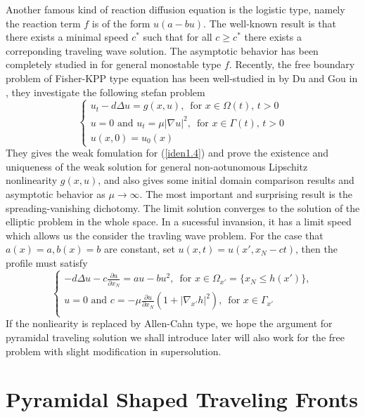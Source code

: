 \documentclass[12pt, a4paper]{article}
\numberwithin{equation}{section}
\newcommand{\pd}[2]{\frac{\partial #1}{\partial #2}}
\begin{document}
\begin{CJK}{UTF8}{bkai}
	Another famous kind of reaction diffusion equation is the logistic type, namely the reaction term $f$ is of the form $u(a-bu)$. The well-known result is that there exists a minimal speed $c^*$ such that for all $c\geq c^*$ there exists a correponding traveling wave solution. The asymptotic behavior has been completely studied in \cite{Sa1976} for general monostable type $f$. Recently, the free boundary problem of Fisher-KPP type equation has been well-studied in by Du and Gou in \cite{DG2012}, they investigate the following stefan problem
\begin{equation}\label{iden1.4}
\begin{cases}
	u_t-d\Delta u=g(x,u),\,\mbox{ for }x\in\Omega(t),\,t>0\\
	u=0\mbox{ and }u_t=\mu|\nabla u|^2,\,\mbox{ for }x\in\Gamma(t),\,t>0\\
	u(x,0)=u_0(x)
\end{cases}
\end{equation}
They gives the weak fomulation for (\ref{iden1.4}) and prove the existence and uniqueness of the weak solution for general non-aotunomous Lipschitz nonlinearity $g(x,u)$, and also gives some initial domain comparison results and asymptotic behavior as $\mu\to\infty$. The most important and surprising result is the spreading-vanishing dichotomy. The limit solution converges to the solution of the elliptic problem in the whole space. In a sucessful invansion, it has a limit speed which allows us the consider the travling wave problem. For the case that $a(x)=a, b(x)=b$ are constant, set $u(x,t)=u(x',x_N-ct)$, then the profile must satisfy
\begin{equation}
\begin{cases}
	-d\Delta u-c\pd{u}{x_N}=au-bu^2,\,\mbox{ for }x\in\Omega_{x'}=\{x_N\leq h(x')\},\\
	u=0\mbox{ and }c=-\mu\pd{u}{x_N}(1+|\nabla_{x'}h|^2),\,\mbox{ for }x\in\Gamma_{x'}\\
\end{cases}
\end{equation}
	If the nonliearity is replaced by Allen-Cahn type, we hope the argument for pyramidal traveling solution we shall introduce later will also work for the free problem with slight modification in supersolution.








\section{Pyramidal Shaped Traveling Fronts}


\end{CJK}
\end{document}
